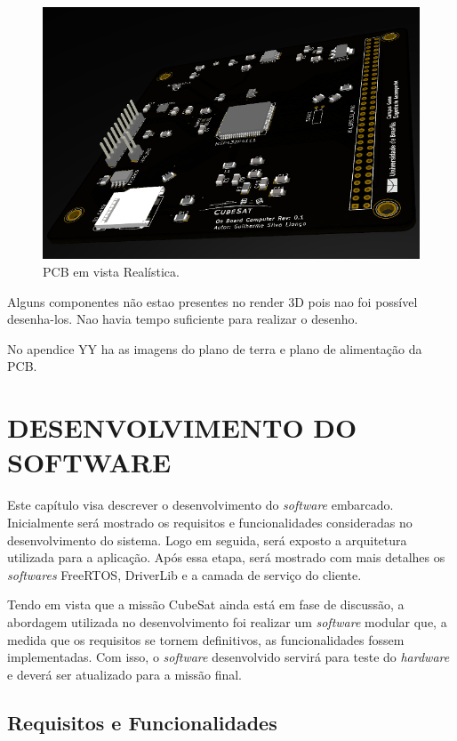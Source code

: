 \begin{figure}[h]
	\centering
	\includegraphics[keepaspectratio=true,scale=0.78]{figuras/pcbRealistic.PNG}
	\caption{PCB em vista Realística.}
	\label{arquiteturaOBC}
\end{figure}

Alguns componentes não estao presentes no render 3D pois nao foi possível desenha-los. Nao havia tempo suficiente para realizar o desenho.

No apendice YY ha as imagens do plano de terra e plano de alimentação da PCB.

\chapter[DESENVOLVIMENTO DO SOFTWARE]{DESENVOLVIMENTO DO SOFTWARE}

Este capítulo visa descrever o desenvolvimento do \textit{software} embarcado. Inicialmente será mostrado os requisitos e funcionalidades consideradas no desenvolvimento do sistema. Logo em seguida, será exposto a arquitetura utilizada para a aplicação. Após essa etapa, será mostrado com mais detalhes os \textit{softwares} FreeRTOS, DriverLib e a camada de serviço do cliente. 

Tendo em vista que a missão CubeSat ainda está em fase de discussão, a abordagem utilizada no desenvolvimento foi realizar um \textit{software} modular que, a medida que os requisitos se tornem definitivos, as funcionalidades fossem implementadas. Com isso, o \textit{software} desenvolvido servirá para teste do \textit{hardware} e deverá ser atualizado para a missão final.

\section{Requisitos e Funcionalidades}

